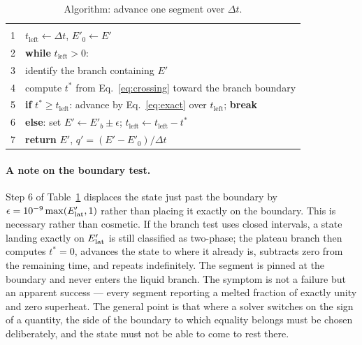 \begin{table}[htbp]
\centering
\caption{Algorithm: advance one segment over $\Delta t$.}
\label{tab:algorithm}
\begin{tabular}{@{}r l@{}}
\toprule
 & \\[-8pt]
1 & $t_{\mathrm{left}} \leftarrow \Delta t$, \quad $E'_{0}\leftarrow E'$ \\
2 & \textbf{while} $t_{\mathrm{left}}>0$: \\
3 & \quad identify the branch containing $E'$ \\
4 & \quad compute $t^{*}$ from Eq.~\eqref{eq:crossing} toward the branch boundary \\
5 & \quad \textbf{if} $t^{*} \ge t_{\mathrm{left}}$: advance by Eq.~\eqref{eq:exact}
        over $t_{\mathrm{left}}$; \textbf{break} \\
6 & \quad \textbf{else}: set $E'\leftarrow E'_{b}\pm\epsilon$;\quad
        $t_{\mathrm{left}} \leftarrow t_{\mathrm{left}}-t^{*}$ \\
7 & \textbf{return} $E'$, \quad $q' = (E'-E'_{0})/\Delta t$ \\[2pt]
\bottomrule
\end{tabular}
\end{table}

\paragraph{A note on the boundary test.}
Step 6 of Table~\ref{tab:algorithm} displaces the state just past the boundary
by $\epsilon=10^{-9}\max(E'_{\mathrm{lat}},1)$ rather than placing it exactly on the
boundary. This is necessary rather than cosmetic. If the branch test uses closed
intervals, a state landing exactly on $E'_{\mathrm{lat}}$ is still classified as two-phase;
the plateau branch then computes $t^{*}=0$, advances the state to where it
already is, subtracts zero from the remaining time, and repeats indefinitely.
The segment is pinned at the boundary and never enters the liquid branch. The
symptom is not a failure but an apparent success --- every segment reporting a
melted fraction of exactly unity and zero superheat. The general point is that
where a solver switches on the sign of a quantity, the side of the boundary to
which equality belongs must be chosen deliberately, and the state must not be
able to come to rest there.

